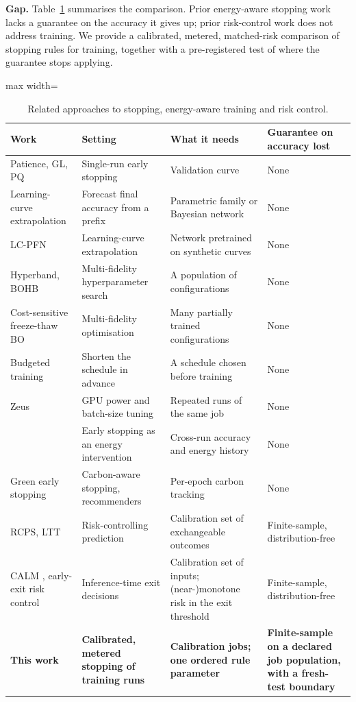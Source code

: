 \documentclass[3p,twocolumn,10pt]{elsarticle}
\theoremstyle{definition}
\begin{document}
\textbf{Gap.} Table~\ref{tab:related} summarises the comparison. Prior energy-aware stopping work lacks a guarantee on the accuracy it gives up; prior risk-control work does not address training. We provide a calibrated, metered, matched-risk comparison of stopping rules for training, together with a pre-registered test of where the guarantee stops applying.

\begin{table}[t]
\centering
\caption{Related approaches to stopping, energy-aware training and risk control.}
\label{tab:related}
\footnotesize
\begin{adjustbox}{max width=\textwidth}
\begin{tabular}{p{3.4cm}p{4.0cm}p{4.0cm}p{3.6cm}}
\toprule
Work & Setting & What it needs & Guarantee on accuracy lost \\
\midrule
Patience, GL, PQ \citep{prechelt1998early} & Single-run early stopping & Validation curve & None \\
Learning-curve extrapolation \citep{domhan2015speeding,klein2017learningcurve} & Forecast final accuracy from a prefix & Parametric family or Bayesian network & None \\
LC-PFN \citep{adriaensen2023lcpfn} & Learning-curve extrapolation & Network pretrained on synthetic curves & None \\
Hyperband, BOHB \citep{li2018hyperband,falkner2018bohb} & Multi-fidelity hyperparameter search & A population of configurations & None \\
Cost-sensitive freeze-thaw BO \citep{freezethaw2025} & Multi-fidelity optimisation & Many partially trained configurations & None \\
Budgeted training \citep{li2020budgeted} & Shorten the schedule in advance & A schedule chosen before training & None \\
Zeus \citep{chung2023zeus} & GPU power and batch-size tuning & Repeated runs of the same job & None \\
\citet{reguero2025energy} & Early stopping as an energy intervention & Cross-run accuracy and energy history & None \\
Green early stopping \citep{carbonaware2025} & Carbon-aware stopping, recommenders & Per-epoch carbon tracking & None \\
RCPS, LTT \citep{bates2021rcps,angelopoulos2025ltt} & Risk-controlling prediction & Calibration set of exchangeable outcomes & Finite-sample, distribution-free \\
CALM \citep{schuster2022calm}, early-exit risk control \citep{jazbec2024fastsafe} & Inference-time exit decisions & Calibration set of inputs; (near-)monotone risk in the exit threshold & Finite-sample, distribution-free \\
\textbf{This work} & \textbf{Calibrated, metered stopping of training runs} & \textbf{Calibration jobs; one ordered rule parameter} & \textbf{Finite-sample on a declared job population, with a fresh-test boundary} \\
\bottomrule
\end{tabular}
\end{adjustbox}
\end{table}
\end{document}

